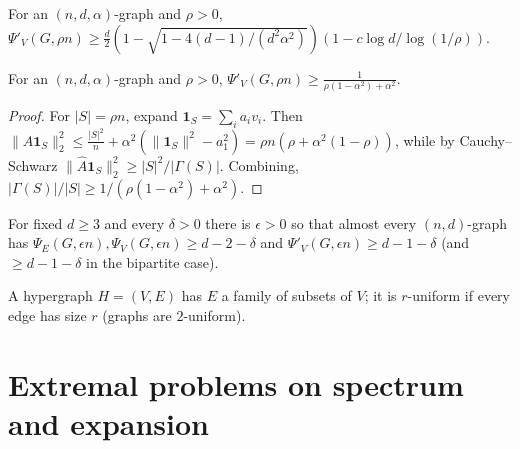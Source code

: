 \begin{theorem}
  \label{thm:kahale}
  \notready
  For an $(n,d,\alpha)$-graph and $\rho>0$,
  $\Psi'_V(G,\rho n)\ge\frac d2(1-\sqrt{1-4(d-1)/(d^2\alpha^2)})(1-c\log
  d/\log(1/\rho))$.
\end{theorem}

\begin{theorem}
  \label{thm:tanner}
  For an $(n,d,\alpha)$-graph and $\rho>0$,
  $\Psi'_V(G,\rho n)\ge\frac1{\rho(1-\alpha^2)+\alpha^2}$.
\end{theorem}
\begin{proof}
  For $|S|=\rho n$, expand $\mathbf 1_S=\sum_ia_iv_i$. Then
  $\|\hat A\mathbf 1_S\|_2^2\le\tfrac{|S|^2}n+\alpha^2(\|\mathbf 1_S\|^2-a_1^2)
  =\rho n(\rho+\alpha^2(1-\rho))$, while by Cauchy--Schwarz
  $\|\hat A\mathbf 1_S\|_2^2\ge|S|^2/|\Gamma(S)|$. Combining,
  $|\Gamma(S)|/|S|\ge1/(\rho(1-\alpha^2)+\alpha^2)$.
\end{proof}

\begin{theorem}
  \label{thm:typical-expansion}
  \notready
  For fixed $d\ge3$ and every $\delta>0$ there is $\epsilon>0$ so that almost
  every $(n,d)$-graph has $\Psi_E(G,\epsilon n),\Psi_V(G,\epsilon n)\ge d-2-\delta$
  and $\Psi'_V(G,\epsilon n)\ge d-1-\delta$ (and $\ge d-1-\delta$ in the
  bipartite case).
\end{theorem}

\begin{definition}[Hypergraph]
  \label{def:hypergraph}
  A hypergraph $H=(V,E)$ has $E$ a family of subsets of $V$; it is
  $r$-uniform if every edge has size $r$ (graphs are $2$-uniform).
\end{definition}


\chapter{Extremal problems on spectrum and expansion}

